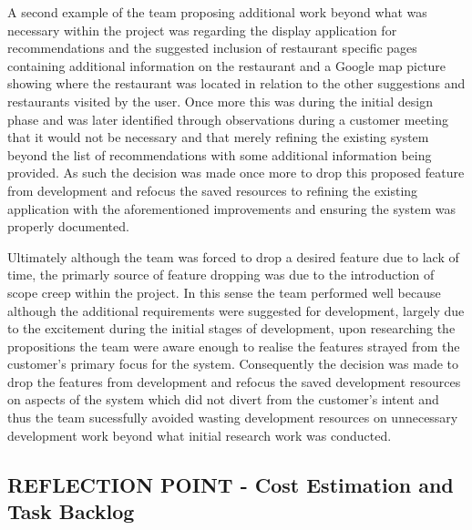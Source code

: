 \documentclass{l3proj}
\begin{document}
A second example of the team proposing additional work beyond what was necessary within the project was regarding the display application for recommendations and the suggested inclusion of restaurant specific pages containing  additional information on the restaurant and a Google map picture showing where the restaurant was located in relation to the other suggestions and restaurants visited by the user. Once more this was during the initial design phase and was later identified through observations during a customer meeting that it would not be necessary and that merely refining the existing system beyond the list of recommendations with some additional information being provided. As such the decision was made once more to drop this proposed feature from development and refocus the saved resources to refining the existing application with the aforementioned improvements and ensuring the system was properly documented. 

Ultimately although the team was forced to drop a desired feature due to lack of time, the primarly source of feature dropping was due to the introduction of scope creep within the project. In this sense the team performed well because although the additional requirements were suggested for development, largely due to the excitement during the initial stages of development, upon researching the propositions the team were aware enough to realise the features strayed from the customer's primary focus for the system. Consequently the decision was made to drop the features from development and refocus the saved development resources on aspects of the system which did not divert from the customer's intent and thus the team sucessfully avoided wasting development resources on unnecessary development work beyond what initial research work was conducted. 


\subsection{REFLECTION POINT - Cost Estimation and Task Backlog}
\label{sec:costreflection}
\end{document}
